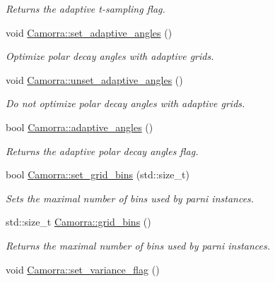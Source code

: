 \begin{DoxyCompactItemize}
\begin{DoxyCompactList}\small\item\em Returns the adaptive t-\/sampling flag. \end{DoxyCompactList}\item 
\hypertarget{a00829_acc556f61f831cf0c8d89742ce981ff8c}{
void \hyperlink{a00829_acc556f61f831cf0c8d89742ce981ff8c}{Camorra::set\_\-adaptive\_\-angles} ()}
\label{a00829_acc556f61f831cf0c8d89742ce981ff8c}

\begin{DoxyCompactList}\small\item\em Optimize polar decay angles with adaptive grids. \end{DoxyCompactList}\item 
\hypertarget{a00829_afcc112f29448eea96b957d0cbe2507f2}{
void \hyperlink{a00829_afcc112f29448eea96b957d0cbe2507f2}{Camorra::unset\_\-adaptive\_\-angles} ()}
\label{a00829_afcc112f29448eea96b957d0cbe2507f2}

\begin{DoxyCompactList}\small\item\em Do not optimize polar decay angles with adaptive grids. \end{DoxyCompactList}\item 
\hypertarget{a00829_af43bdefe26b0a357ead80b081285b99f}{
bool \hyperlink{a00829_af43bdefe26b0a357ead80b081285b99f}{Camorra::adaptive\_\-angles} ()}
\label{a00829_af43bdefe26b0a357ead80b081285b99f}

\begin{DoxyCompactList}\small\item\em Returns the adaptive polar decay angles flag. \end{DoxyCompactList}\item 
bool \hyperlink{a00829_a6d2bc8b8821a29006938082d6b6bef2d}{Camorra::set\_\-grid\_\-bins} (std::size\_\-t)
\begin{DoxyCompactList}\small\item\em Sets the maximal number of bins used by parni instances. \end{DoxyCompactList}\item 
\hypertarget{a00829_a5febf7380bc1a76257efddb93a86f603}{
std::size\_\-t \hyperlink{a00829_a5febf7380bc1a76257efddb93a86f603}{Camorra::grid\_\-bins} ()}
\label{a00829_a5febf7380bc1a76257efddb93a86f603}

\begin{DoxyCompactList}\small\item\em Returns the maximal number of bins used by parni instances. \end{DoxyCompactList}\item 
\hypertarget{a00829_aa7b42851ed5d3379322e84466ad5258d}{
void \hyperlink{a00829_aa7b42851ed5d3379322e84466ad5258d}{Camorra::set\_\-variance\_\-flag} ()}
\label{a00829_aa7b42851ed5d3379322e84466ad5258d}


\end{DoxyCompactItemize}
